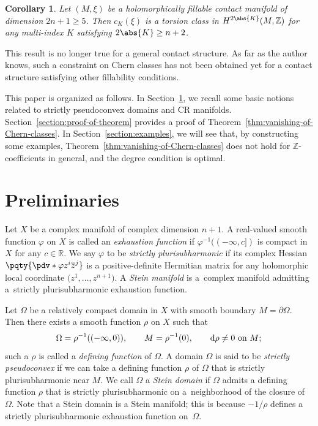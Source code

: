 \documentclass[10pt,a4paper]{amsart}
\newcommand{\opcl}[2]{(#1, #2]}
\numberwithin{equation}{section}
\newtheorem{Corollary}[Theorem]{Corollary}
\begin{document}
\begin{Corollary}Let $(M, \xi)$ be a holomorphically fillable contact manifold of dimension $2 n + 1 \geq 5$. Then $c_{K}(\xi)$ is a torsion class in $H^{2 \abs{K}}(M, \mathbb{Z})$ for any multi-index $K$ satisfying $2 \abs{K} \geq n + 2$.
\end{Corollary}

This result is no longer true for a general contact structure. As far as the author knows, such a constraint on Chern classes has not been obtained yet for a contact structure
satisfying other fillability conditions.

This paper is organized as follows. In Section~\ref{section:preliminaries}, we recall some basic notions related to strictly pseudoconvex domains and CR manifolds.
Section~\ref{section:proof-of-theorem} provides a proof of Theorem~\ref{thm:vanishing-of-Chern-classes}. In Section~\ref{section:examples}, we will see that, by constructing some examples, Theorem~\ref{thm:vanishing-of-Chern-classes} does not hold for $\mathbb{Z}$-coefficients in general, and the degree condition is optimal.

\section{Preliminaries} \label{section:preliminaries}

Let $X$ be a complex manifold of complex dimension $n + 1$. A real-valued smooth function $\varphi$ on $X$ is called an \emph{exhaustion function} if $\varphi^{- 1}(\opcl{- \infty}{c})$ is compact in $X$ for any $c \in \mathbb{R}$. We say $\varphi$ to be \emph{strictly plurisubharmonic} if its complex Hessian $\pqty{\pdv*{\varphi}{z^{i}}{\overline{z}^{j}}}$ is a positive-definite Hermitian matrix for any holomorphic local coordinate $\big(z^{1}, \dots , z^{n + 1}\big)$. A \emph{Stein manifold} is a~complex manifold admitting a~strictly plurisubharmonic exhaustion function.

Let $\Omega$ be a relatively compact domain in $X$ with smooth boundary $M = \partial \Omega$. Then there exists a smooth function $\rho$ on $X$ such that
\begin{gather*}
\Omega = \rho^{-1}((- \infty, 0)), \qquad M = \rho^{- 1}(0), \qquad
{\rm d} \rho \neq 0 \ \text{on} \ M;
\end{gather*}
such a $\rho$ is called a \emph{defining function} of $\Omega$. A domain $\Omega$ is said to be \emph{strictly pseudoconvex} if we can take a defining function $\rho$ of $\Omega$ that is strictly plurisubharmonic near $M$. We call $\Omega$ a \emph{Stein domain} if $\Omega$ admits a defining function $\rho$ that is strictly plurisubharmonic on a~neighborhood of the closure of $\Omega$. Note that a Stein domain is a Stein manifold; this is because $- 1 / \rho$ defines a strictly plurisubharmonic exhaustion function on~$\Omega$.
\end{document}
